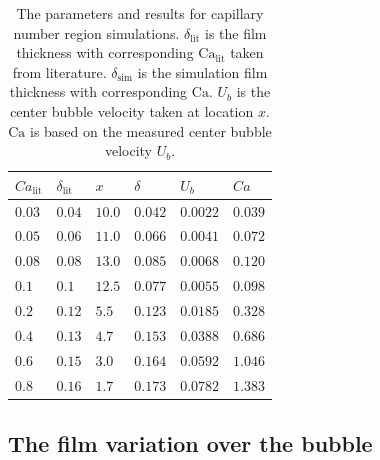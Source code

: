 \documentclass[preprint,12pt]{elsarticle}
\newcommand{\Ca}{\mathrm{Ca}}
\begin{document}
\begin{table}
\begin{tabularx}{\textwidth}{|X|X|X|X|X|X|}
\hline
$Ca_{\mathrm{lit}}$&$\delta_{\mathrm{lit}}$&$x$&$\delta$&$U_b$&$Ca$\\
\hline
$0.03$&$0.04$&$10.0$&$0.042$&$0.0022$&$0.039$\\
\hline
$0.05$&$0.06$&$11.0$&$0.066$&$0.0041$&$0.072$\\
\hline
$0.08$&$0.08$&$13.0$&$0.085$&$0.0068$&$0.120$\\
\hline
$0.1$&$0.1$&$12.5$&$0.077$&$0.0055$&$0.098$\\
\hline
$0.2$&$0.12$&$5.5$&$0.123$&$0.0185$&$0.328$\\
\hline
$0.4$&$0.13$&$4.7$&$0.153$&$0.0388$&$0.686$\\
\hline
$0.6$&$0.15$&$3.0$&$0.164$&$0.0592$&$1.046$\\
\hline
$0.8$&$0.16$&$1.7$&$0.173$&$0.0782$&$1.383$\\
\hline
\end{tabularx}
\caption{The parameters and results for capillary number region simulations.
$\delta_{\mathrm{lit}}$ is the film thickness with corresponding $\Ca_{\mathrm{lit}}$ taken from
literature. $\delta_\mathrm{sim}$ is the simulation film thickness with corresponding $\Ca$. $U_b$ is the
center bubble velocity taken at location $x$. $\Ca$ is based on the measured center bubble velocity
$U_{b}$.
\label{table:parameters:capillary:number}}
\end{table}



\subsection{The film variation over the bubble}
\end{document}
